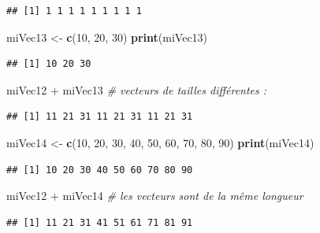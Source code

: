 \documentclass[twoside,symmetric]{book}
\newenvironment{Shaded}{}{}
\newcommand{\CommentTok}[1]{\textit{#1}}
\newcommand{\DecValTok}[1]{#1}
\newcommand{\KeywordTok}[1]{\textbf{#1}}
\newcommand{\NormalTok}[1]{#1}
\newcommand{\OperatorTok}[1]{#1}
\newcommand{\StringTok}[1]{#1}
\begin{document}
\begin{verbatim}
## [1] 1 1 1 1 1 1 1 1 1
\end{verbatim}

\begin{Shaded}
\begin{Highlighting}[]
\NormalTok{miVec13 <-}\StringTok{ }\KeywordTok{c}\NormalTok{(}\DecValTok{10}\NormalTok{, }\DecValTok{20}\NormalTok{, }\DecValTok{30}\NormalTok{)}
\KeywordTok{print}\NormalTok{(miVec13)}
\end{Highlighting}
\end{Shaded}

\begin{verbatim}
## [1] 10 20 30
\end{verbatim}

\begin{Shaded}
\begin{Highlighting}[]
\NormalTok{miVec12 }\OperatorTok{+}\StringTok{ }\NormalTok{miVec13 }\CommentTok{# vecteurs de tailles différentes : }
\end{Highlighting}
\end{Shaded}

\begin{verbatim}
## [1] 11 21 31 11 21 31 11 21 31
\end{verbatim}

\begin{Shaded}
\begin{Highlighting}[]
\NormalTok{miVec14 <-}\StringTok{ }\KeywordTok{c}\NormalTok{(}\DecValTok{10}\NormalTok{, }\DecValTok{20}\NormalTok{, }\DecValTok{30}\NormalTok{, }\DecValTok{40}\NormalTok{, }\DecValTok{50}\NormalTok{, }\DecValTok{60}\NormalTok{, }\DecValTok{70}\NormalTok{, }\DecValTok{80}\NormalTok{, }\DecValTok{90}\NormalTok{)}
\KeywordTok{print}\NormalTok{(miVec14)}
\end{Highlighting}
\end{Shaded}

\begin{verbatim}
## [1] 10 20 30 40 50 60 70 80 90
\end{verbatim}

\begin{Shaded}
\begin{Highlighting}[]
\NormalTok{miVec12 }\OperatorTok{+}\StringTok{ }\NormalTok{miVec14 }\CommentTok{# les vecteurs sont de la même longueur}
\end{Highlighting}
\end{Shaded}

\begin{verbatim}
## [1] 11 21 31 41 51 61 71 81 91
\end{verbatim}
\end{document}
